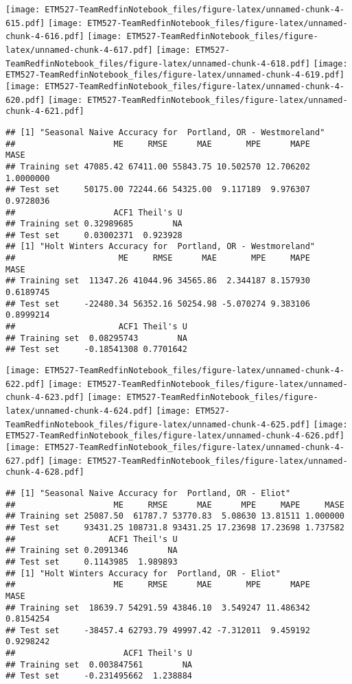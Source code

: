 \documentclass[]{article}
\begin{document}
\texttt{[image: ETM527-TeamRedfinNotebook\_files/figure-latex/unnamed-chunk-4-615.pdf]}
\texttt{[image: ETM527-TeamRedfinNotebook\_files/figure-latex/unnamed-chunk-4-616.pdf]}
\texttt{[image: ETM527-TeamRedfinNotebook\_files/figure-latex/unnamed-chunk-4-617.pdf]}
\texttt{[image: ETM527-TeamRedfinNotebook\_files/figure-latex/unnamed-chunk-4-618.pdf]}
\texttt{[image: ETM527-TeamRedfinNotebook\_files/figure-latex/unnamed-chunk-4-619.pdf]}
\texttt{[image: ETM527-TeamRedfinNotebook\_files/figure-latex/unnamed-chunk-4-620.pdf]}
\texttt{[image: ETM527-TeamRedfinNotebook\_files/figure-latex/unnamed-chunk-4-621.pdf]}

\begin{verbatim}
## [1] "Seasonal Naive Accuracy for  Portland, OR - Westmoreland"
##                    ME     RMSE      MAE       MPE      MAPE      MASE
## Training set 47085.42 67411.00 55843.75 10.502570 12.706202 1.0000000
## Test set     50175.00 72244.66 54325.00  9.117189  9.976307 0.9728036
##                    ACF1 Theil's U
## Training set 0.32989685        NA
## Test set     0.03002371  0.923928
## [1] "Holt Winters Accuracy for  Portland, OR - Westmoreland"
##                     ME     RMSE      MAE       MPE     MAPE      MASE
## Training set  11347.26 41044.96 34565.86  2.344187 8.157930 0.6189745
## Test set     -22480.34 56352.16 50254.98 -5.070274 9.383106 0.8999214
##                     ACF1 Theil's U
## Training set  0.08295743        NA
## Test set     -0.18541308 0.7701642
\end{verbatim}

\texttt{[image: ETM527-TeamRedfinNotebook\_files/figure-latex/unnamed-chunk-4-622.pdf]}
\texttt{[image: ETM527-TeamRedfinNotebook\_files/figure-latex/unnamed-chunk-4-623.pdf]}
\texttt{[image: ETM527-TeamRedfinNotebook\_files/figure-latex/unnamed-chunk-4-624.pdf]}
\texttt{[image: ETM527-TeamRedfinNotebook\_files/figure-latex/unnamed-chunk-4-625.pdf]}
\texttt{[image: ETM527-TeamRedfinNotebook\_files/figure-latex/unnamed-chunk-4-626.pdf]}
\texttt{[image: ETM527-TeamRedfinNotebook\_files/figure-latex/unnamed-chunk-4-627.pdf]}
\texttt{[image: ETM527-TeamRedfinNotebook\_files/figure-latex/unnamed-chunk-4-628.pdf]}

\begin{verbatim}
## [1] "Seasonal Naive Accuracy for  Portland, OR - Eliot"
##                    ME     RMSE      MAE      MPE     MAPE     MASE
## Training set 25087.50  61787.7 53770.83  5.08630 13.81511 1.000000
## Test set     93431.25 108731.8 93431.25 17.23698 17.23698 1.737582
##                   ACF1 Theil's U
## Training set 0.2091346        NA
## Test set     0.1143985  1.989893
## [1] "Holt Winters Accuracy for  Portland, OR - Eliot"
##                    ME     RMSE      MAE       MPE      MAPE      MASE
## Training set  18639.7 54291.59 43846.10  3.549247 11.486342 0.8154254
## Test set     -38457.4 62793.79 49997.42 -7.312011  9.459192 0.9298242
##                      ACF1 Theil's U
## Training set  0.003847561        NA
## Test set     -0.231495662  1.238884
\end{verbatim}
\end{document}
